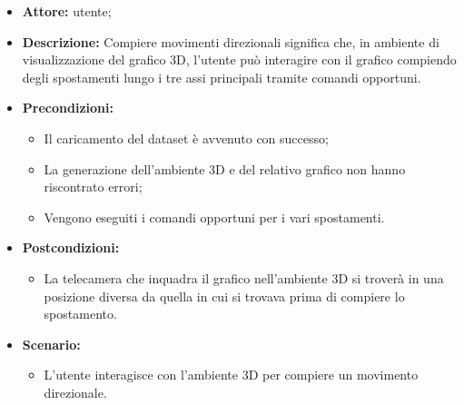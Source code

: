 \begin{itemize}    
    \item \textbf{Attore:} utente;
    \item \textbf{Descrizione:} Compiere movimenti direzionali significa che, in ambiente di visualizzazione del grafico 3D, l'utente può interagire con il grafico compiendo degli spostamenti lungo i tre assi principali tramite comandi opportuni.
    \item \textbf{Precondizioni:}    
        \begin{itemize}
            \item Il caricamento del dataset è avvenuto con successo;
            \item La generazione dell'ambiente 3D e del relativo grafico non hanno riscontrato errori;
            \item Vengono eseguiti i comandi opportuni per i vari spostamenti.
        \end{itemize}    
    \item \textbf{Postcondizioni:}
        \begin{itemize}
            \item La telecamera che inquadra il grafico nell'ambiente 3D si troverà in una posizione diversa da quella in cui si trovava prima di compiere lo spostamento.
        \end{itemize}    
    \item \textbf{Scenario:} 
        \begin{itemize}
            \item L'utente interagisce con l'ambiente 3D per compiere un movimento direzionale.
        \end{itemize}
\end{itemize}
